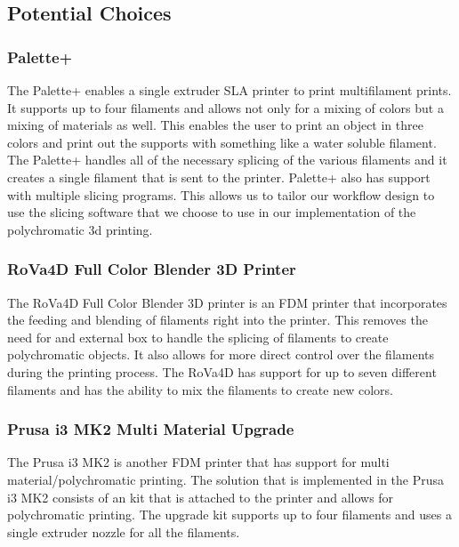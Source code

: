 \documentclass[letterpaper, onecolumn, draftclsnofoot, 10pt, compsoc]{IEEEtran}
\begin{document}
\subsection{Potential Choices}
\subsubsection{Palette+}
	\begin{singlespacing}
    The Palette+ enables a single extruder SLA printer to print multifilament prints. It supports up to four filaments and allows not only for a mixing of colors but a mixing of materials as well. This enables the user to print an object in three colors and print out the supports with something like a water soluble filament. The Palette+ handles all of the necessary splicing of the various filaments and it creates a single filament that is sent to the printer. Palette+ also has support with multiple slicing programs. This allows us to tailor our workflow design to use the slicing software that we choose to use in our implementation of the polychromatic 3d printing.\cite{palette+}
    \end{singlespacing}
\subsubsection{RoVa4D Full Color Blender 3D Printer}
	\begin{singlespacing}
    The RoVa4D Full Color Blender 3D printer is an FDM printer that incorporates the feeding and blending of filaments right into the printer. This removes the need for and external box to handle the splicing of filaments to create polychromatic objects. It also allows for more direct control over the filaments during the printing process. The RoVa4D has support for up to seven different filaments and has the ability to mix the filaments to create new colors.\cite{rova4d}
    \end{singlespacing}
\subsubsection{Prusa i3 MK2 Multi Material Upgrade}
	\begin{singlespacing}
    The Prusa i3 MK2 is another FDM printer that has support for multi material/polychromatic printing. The solution that is implemented in the Prusa i3 MK2 consists of an kit that is attached to the printer and allows for polychromatic printing. The upgrade kit supports up to four filaments and uses a single extruder nozzle for all the filaments. \cite{prusai3}
    \end{singlespacing}
\end{document}
